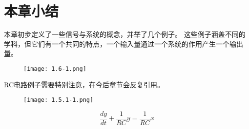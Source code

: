 \section{本章小结}

本章初步定义了一些信号与系统的概念，并举了几个例子。
这些例子涵盖不同的学科，但它们有一个共同的特点，一个输入量通过一个系统的作用产生一个输出量。

\begin{figure}[h]
\centering
\texttt{[image: 1.6-1.png]}
\end{figure}

RC电路例子需要特别注意，在今后章节会反复引用。
\begin{figure}[h]
\centering
\texttt{[image: 1.5.1-1.png]}
\end{figure}
\[
\frac{dy}{dt}+\frac{1}{RC}y=\frac{1}{RC}x
\]




